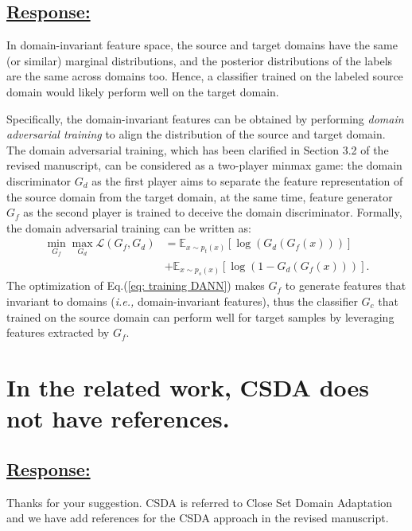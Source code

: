 \subsection*{\underline{\textbf{Response:}}}

In domain-invariant feature space, the source and target domains have the same (or similar) marginal distributions, and the posterior distributions of the labels are the same across domains too.
Hence, a classifier trained on the labeled source domain would likely perform well on the target domain.

Specifically, the domain-invariant features can be obtained by performing \textit{domain adversarial training} \cite{DomainAdversrialNetwork} to align the distribution of the source and target domain.
The domain adversarial training, which has been clarified in Section 3.2 of the revised manuscript, can be considered as a two-player minmax game:
the domain discriminator $G_d$ as the first player aims to separate the feature representation of the source domain from the target domain, at the same time, feature generator $G_f$ as the second player is trained to deceive the domain discriminator.
Formally, the domain adversarial training can be written as:
\begin{equation}
    \label{eq: training DANN}
    \begin{split}
        \min_{G_f} \max_{G_d} \mathscr{L}(G_f,G_d) &=\mathbb{E}_{x\sim p_t(x)} \left[ \log \left(G_d\left(G_f\left(x\right)\right)\right) \right]\\
        &+\mathbb{E}_{x\sim p_s(x)}\left[ \log \left(1-G_d\left(G_f\left(x\right)\right)\right) \right].
    \end{split}
\end{equation}
The optimization of Eq.(\ref{eq: training DANN}) makes $G_f$ to generate features that invariant to domains (\textit{i.e.,} domain-invariant features), thus the classifier $G_c$ that trained on the source domain can perform well for target samples by leveraging features extracted by $G_f$.

\section{In the related work, CSDA does not have references.}
\subsection*{\underline{\textbf{Response:}}}
Thanks for your suggestion.
CSDA is referred to Close Set Domain Adaptation and we have add references \cite{ben2010theory,Elsevier-DeepVisualDA,TransferLearningSurvey} for the CSDA approach in the revised manuscript.

